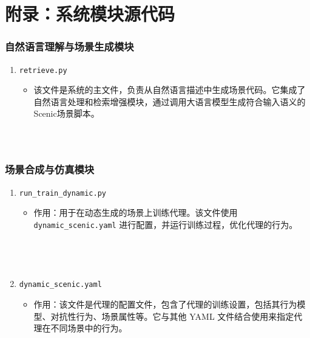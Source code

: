 \chapter{附录：系统模块源代码}

\subsection*{自然语言理解与场景生成模块}
\begin{enumerate}
	\item \texttt{retrieve.py}
	\begin{itemize}
		\item 该文件是系统的主文件，负责从自然语言描述中生成场景代码。它集成了自然语言处理和检索增强模块，通过调用大语言模型生成符合输入语义的Scenic场景脚本。
	\end{itemize}
	\begin{verbatim}
		
		
	\end{verbatim}
\end{enumerate}

\subsection*{场景合成与仿真模块}
\begin{enumerate}
	\item \texttt{run\_train\_dynamic.py}
	\begin{itemize}
		\item 作用：用于在动态生成的场景上训练代理。该文件使用 \texttt{dynamic\_scenic.yaml} 进行配置，并运行训练过程，优化代理的行为。
	\end{itemize}
	\begin{verbatim}
		
		
		
	\end{verbatim}
	
	\item \texttt{dynamic\_scenic.yaml}
	\begin{itemize}
		\item 作用：该文件是代理的配置文件，包含了代理的训练设置，包括其行为模型、对抗性行为、场景属性等。它与其他 YAML 文件结合使用来指定代理在不同场景中的行为。
	\end{itemize}
	\begin{verbatim}
		
		
	\end{verbatim}
\end{enumerate}

